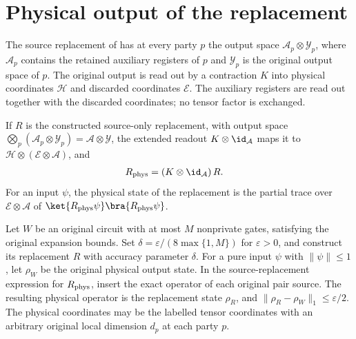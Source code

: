 \section{Physical output of the replacement}
\label{sec:peps_physical_first_output}

The source replacement of
\cite[proof of Theorem~5.2]{OpenAI2026PolynomialPEPS} has at every party
$p$ the output space $\mathcal A_p\otimes\mathcal Y_p$, where $\mathcal A_p$
contains the retained auxiliary registers of $p$ and $\mathcal Y_p$ is the
original output space of $p$. The original output is read out by a
contraction $K$ into physical coordinates $\mathcal H$ and discarded
coordinates $\mathcal E$. The auxiliary registers are read out together with
the discarded coordinates; no tensor factor is exchanged.

\begin{definition}
    \label{def:peps_physical_first_replacement}
    \leanok
    If $R$ is the constructed source-only replacement, with output space
    $\bigotimes_p(\mathcal A_p\otimes\mathcal Y_p)=\mathcal A\otimes\mathcal Y$,
    the extended readout $K\otimes\id_{\mathcal A}$ maps it to
    $\mathcal H\otimes(\mathcal E\otimes\mathcal A)$, and
    \begin{align}
        R_{\rm phys} & =(K\otimes\id_{\mathcal A})\,R.
        \label{eq:peps_physical_first_exchange}
    \end{align}
    For an input $\psi$, the physical state of the replacement is the partial
    trace over $\mathcal E\otimes\mathcal A$ of
    $\ket{R_{\rm phys}\psi}\bra{R_{\rm phys}\psi}$.
\end{definition}

\begin{lemma}
    \label{thm:peps_physical_first_exact_sources}
    \leanok
    Let $W$ be an original circuit with at most $M$ nonprivate gates,
    satisfying the original expansion bounds. Set
    $\delta=\varepsilon/(8\max\{1,M\})$ for $\varepsilon>0$, and
    construct its replacement $R$ with accuracy parameter $\delta$. For a pure input
    $\psi$ with $\|\psi\|\le1$, let $\rho_W$ be the original physical
    output state. In the source-replacement expression for $R_{\rm phys}$,
    insert the exact operator of each original pair source. The resulting
    physical operator is the replacement state $\rho_R$, and
    $\|\rho_R-\rho_W\|_1\le\varepsilon/2$.
    The physical coordinates may be the labelled tensor coordinates with
    an arbitrary original local dimension $d_p$ at each party $p$.
\end{lemma}

